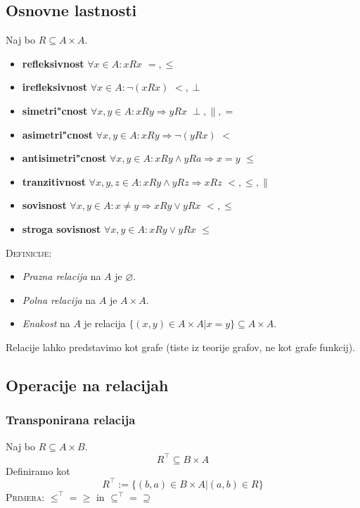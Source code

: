 \subsection{Osnovne lastnosti}
Naj bo $R \subseteq A \times A$.
\begin{itemize}
	\item \textbf{refleksivnost} $\forall x \in A: x R x$ \hfill $=, \leq$
	\item \textbf{irefleksivnost} $\forall x \in A: \lnot (x R x)$ \hfill $<, \perp$
	\item \textbf{simetri"cnost} $\forall x, y \in A: x R y \Rightarrow y R x$ \hfill $\perp, \parallel, =$
	\item \textbf{asimetri"cnost} $\forall x, y \in A: x R y \Rightarrow \lnot(y R x)$ \hfill $<$
	\item \textbf{antisimetri"cnost} $\forall x, y \in A: x R y \land y R a \Rightarrow x = y$ \hfill $\leq$
	\item \textbf{tranzitivnost} $\forall x, y, z \in A: x R y \land y R z \Rightarrow x R z$ \hfill $<, \leq, \parallel$
	\item \textbf{sovisnost} $\forall x, y \in A: x \neq y \Rightarrow x R y \lor y R x$ \hfill $<, \leq$
	\item \textbf{stroga sovisnost} $\forall x, y \in A: x R y \lor y R x$ \hfill $\leq$
\end{itemize}
\textsc{Definicije:}
\begin{itemize}
	\item \emph{Prazna relacija} na $A$ je $\varnothing$.
	\item \emph{Polna relacija} na $A$ je $A \times A$.
	\item \emph{Enakost} na $A$ je relacija $\{(x, y) \in A \times A | x = y\} \subseteq A \times A$.
\end{itemize}
Relacije lahko predstavimo kot grafe (tiste iz teorije grafov, ne kot grafe funkcij).

\subsection{Operacije na relacijah}
\subsubsection*{Transponirana relacija}
Naj bo $R \subseteq A \times B$.
\begin{equation*}
R^\intercal \subseteq B \times A
\end{equation*}
Definiramo kot
\begin{equation*}
R^\intercal := \{(b, a) \in B \times A| (a,b) \in R\}
\end{equation*}
\textsc{Primera:} $\leq^\intercal = \geq$ in $\subseteq^\intercal = \supseteq$

